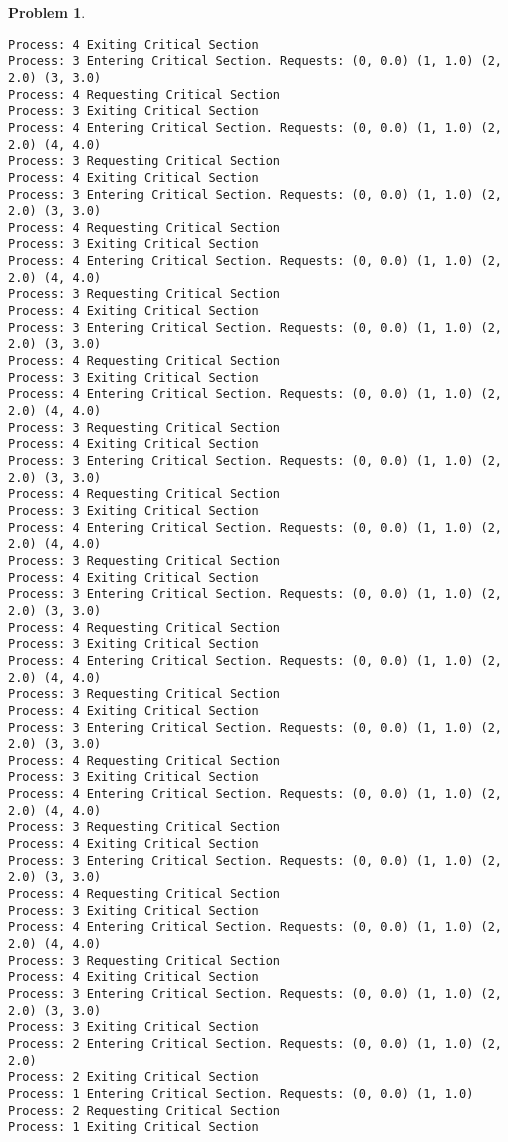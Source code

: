 \documentclass{article}
\theoremstyle{problemstyle}
\newtheorem{problem}{Problem}
\begin{document}
\begin{problem}
\begin{enumerate}[label=(\alph*)]
\begin{lstlisting}
Process: 4 Exiting Critical Section
Process: 3 Entering Critical Section. Requests: (0, 0.0) (1, 1.0) (2, 2.0) (3, 3.0)
Process: 4 Requesting Critical Section
Process: 3 Exiting Critical Section
Process: 4 Entering Critical Section. Requests: (0, 0.0) (1, 1.0) (2, 2.0) (4, 4.0)
Process: 3 Requesting Critical Section
Process: 4 Exiting Critical Section
Process: 3 Entering Critical Section. Requests: (0, 0.0) (1, 1.0) (2, 2.0) (3, 3.0)
Process: 4 Requesting Critical Section
Process: 3 Exiting Critical Section
Process: 4 Entering Critical Section. Requests: (0, 0.0) (1, 1.0) (2, 2.0) (4, 4.0)
Process: 3 Requesting Critical Section
Process: 4 Exiting Critical Section
Process: 3 Entering Critical Section. Requests: (0, 0.0) (1, 1.0) (2, 2.0) (3, 3.0)
Process: 4 Requesting Critical Section
Process: 3 Exiting Critical Section
Process: 4 Entering Critical Section. Requests: (0, 0.0) (1, 1.0) (2, 2.0) (4, 4.0)
Process: 3 Requesting Critical Section
Process: 4 Exiting Critical Section
Process: 3 Entering Critical Section. Requests: (0, 0.0) (1, 1.0) (2, 2.0) (3, 3.0)
Process: 4 Requesting Critical Section
Process: 3 Exiting Critical Section
Process: 4 Entering Critical Section. Requests: (0, 0.0) (1, 1.0) (2, 2.0) (4, 4.0)
Process: 3 Requesting Critical Section
Process: 4 Exiting Critical Section
Process: 3 Entering Critical Section. Requests: (0, 0.0) (1, 1.0) (2, 2.0) (3, 3.0)
Process: 4 Requesting Critical Section
Process: 3 Exiting Critical Section
Process: 4 Entering Critical Section. Requests: (0, 0.0) (1, 1.0) (2, 2.0) (4, 4.0)
Process: 3 Requesting Critical Section
Process: 4 Exiting Critical Section
Process: 3 Entering Critical Section. Requests: (0, 0.0) (1, 1.0) (2, 2.0) (3, 3.0)
Process: 4 Requesting Critical Section
Process: 3 Exiting Critical Section
Process: 4 Entering Critical Section. Requests: (0, 0.0) (1, 1.0) (2, 2.0) (4, 4.0)
Process: 3 Requesting Critical Section
Process: 4 Exiting Critical Section
Process: 3 Entering Critical Section. Requests: (0, 0.0) (1, 1.0) (2, 2.0) (3, 3.0)
Process: 4 Requesting Critical Section
Process: 3 Exiting Critical Section
Process: 4 Entering Critical Section. Requests: (0, 0.0) (1, 1.0) (2, 2.0) (4, 4.0)
Process: 3 Requesting Critical Section
Process: 4 Exiting Critical Section
Process: 3 Entering Critical Section. Requests: (0, 0.0) (1, 1.0) (2, 2.0) (3, 3.0)
Process: 3 Exiting Critical Section
Process: 2 Entering Critical Section. Requests: (0, 0.0) (1, 1.0) (2, 2.0)
Process: 2 Exiting Critical Section
Process: 1 Entering Critical Section. Requests: (0, 0.0) (1, 1.0)
Process: 2 Requesting Critical Section
Process: 1 Exiting Critical Section

\end{lstlisting}
\end{enumerate}
\end{problem}
\end{document}

